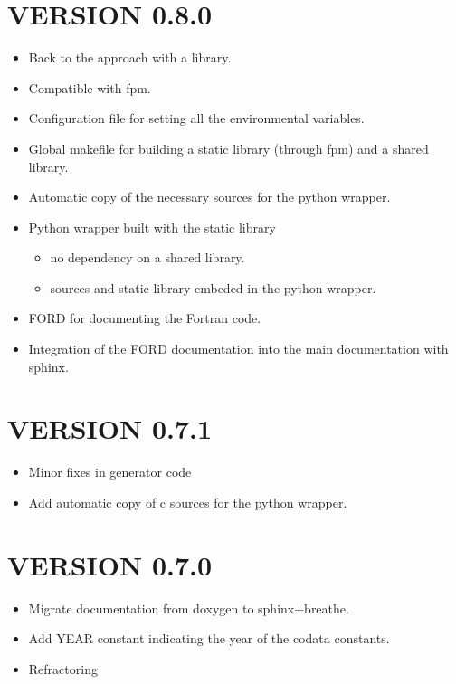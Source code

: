 \section*{VERSION 0.8.0}
\begin{itemize}
\item Back to the approach with a library.
\item Compatible with fpm.
\item Configuration file for setting all the environmental variables.
\item Global makefile for building a static library (through fpm) and a shared library.
\item Automatic copy of the necessary sources for the python wrapper.
\item Python wrapper built with the static library
\begin{itemize}
\item no dependency on a shared library.
\item sources and static library embeded in the python wrapper.
\end{itemize}
\item FORD for documenting the Fortran code.
\item Integration of the FORD documentation into the main documentation with sphinx.
\end{itemize}



\section*{VERSION 0.7.1}
\begin{itemize}
\item Minor fixes in generator code
\item Add automatic copy of c sources for the python wrapper.
\end{itemize}



\section*{VERSION 0.7.0}
\begin{itemize}
\item Migrate documentation from doxygen to sphinx+breathe.
\item Add YEAR constant indicating the year of the codata constants.
\item Refractoring
\end{itemize}



